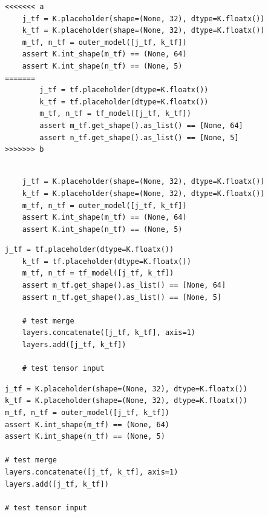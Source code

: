 \begin{lstlisting}[style=conflictcode,title={\textbf{The conflict} (\texttt{0xe63ff0ddae988357})}]
<<<<<<< a
    j_tf = K.placeholder(shape=(None, 32), dtype=K.floatx())
    k_tf = K.placeholder(shape=(None, 32), dtype=K.floatx())
    m_tf, n_tf = outer_model([j_tf, k_tf])
    assert K.int_shape(m_tf) == (None, 64)
    assert K.int_shape(n_tf) == (None, 5)
=======
        j_tf = tf.placeholder(dtype=K.floatx())
        k_tf = tf.placeholder(dtype=K.floatx())
        m_tf, n_tf = tf_model([j_tf, k_tf])
        assert m_tf.get_shape().as_list() == [None, 64]
        assert n_tf.get_shape().as_list() == [None, 5]
>>>>>>> b
\end{lstlisting}

\begin{lstlisting}[style=conflictcode,title={\textbf{Ground-truth resolution} (5 lines, 250 characters)}]

    j_tf = K.placeholder(shape=(None, 32), dtype=K.floatx())
    k_tf = K.placeholder(shape=(None, 32), dtype=K.floatx())
    m_tf, n_tf = outer_model([j_tf, k_tf])
    assert K.int_shape(m_tf) == (None, 64)
    assert K.int_shape(n_tf) == (None, 5)
\end{lstlisting}

\begin{lstlisting}[style=conflictcode,title={\textbf{Apertus-8B, without the skill} --- edit 0.430, winnowing 0.387, 343 characters}]
j_tf = tf.placeholder(dtype=K.floatx())
    k_tf = tf.placeholder(dtype=K.floatx())
    m_tf, n_tf = tf_model([j_tf, k_tf])
    assert m_tf.get_shape().as_list() == [None, 64]
    assert n_tf.get_shape().as_list() == [None, 5]

    # test merge
    layers.concatenate([j_tf, k_tf], axis=1)
    layers.add([j_tf, k_tf])

    # test tensor input
\end{lstlisting}

\begin{lstlisting}[style=conflictcode,title={\textbf{Apertus-8B, with v2 in the system prompt} --- edit 0.702, winnowing 0.861, 330 characters}]
j_tf = K.placeholder(shape=(None, 32), dtype=K.floatx())
k_tf = K.placeholder(shape=(None, 32), dtype=K.floatx())
m_tf, n_tf = outer_model([j_tf, k_tf])
assert K.int_shape(m_tf) == (None, 64)
assert K.int_shape(n_tf) == (None, 5)

# test merge
layers.concatenate([j_tf, k_tf], axis=1)
layers.add([j_tf, k_tf])

# test tensor input
\end{lstlisting}


